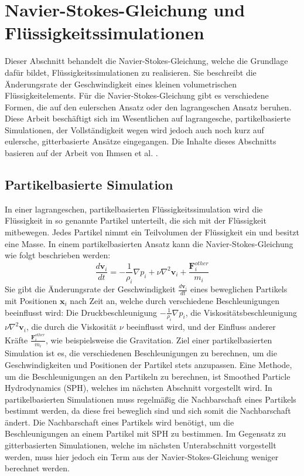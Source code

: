 \documentclass[11pt,
a4paper,
parskip=half, %
BCOR=10mm, %
english,
ngerman]{scrreprt}
\begin{document}
\section{Navier-Stokes-Gleichung und Flüssigkeitssimulationen}
Dieser Abschnitt behandelt die Navier-Stokes-Gleichung, welche die Grundlage dafür bildet, Flüssigkeitssimulationen zu realisieren.
Sie beschreibt die Änderungsrate der Geschwindigkeit eines kleinen volumetrischen Flüssigkeitelements.
Für die Navier-Stokes-Gleichung gibt es verschiedene Formen, die auf den eulerschen Ansatz oder den lagrangeschen Ansatz beruhen.
Diese Arbeit beschäftigt sich im Wesentlichen auf lagrangesche, partikelbasierte Simulationen,
der Vollständigkeit wegen wird jedoch auch noch kurz auf eulersche, gitterbasierte Ansätze eingegangen.
Die Inhalte dieses Abschnitts basieren auf der Arbeit von Ihmsen et al. \cite{ihmsen_sph_2014}.


\subsection{Partikelbasierte Simulation}
In einer lagrangeschen, partikelbasierten Flüssigkeitssimulation wird die Flüssigkeit in so genannte Partikel unterteilt,
die sich mit der Flüssigkeit mitbewegen. Jedes Partikel nimmt ein Teilvolumen der Flüssigkeit ein und besitzt eine Masse.
In einem partikelbasierten Ansatz kann die Navier-Stokes-Gleichung wie folgt beschrieben werden:
\begin{equation}
    \frac{d\textbf{v}_i}{dt} = -\frac{1}{\rho_i} \nabla p_i + \nu \nabla^2 \textbf{v}_i + \frac{\textbf{F}_i^{other}}{m_i}
\end{equation}
Sie gibt die Änderungsrate der Geschwindigkeit $\frac{d\textbf{v}_i}{dt}$ eines beweglichen Partikels mit Positionen $\textbf{x}_i$ nach Zeit an,
welche durch verschiedene Beschleunigungen beeinflusst wird:
Die Druckbeschleunigung $-\frac{1}{\rho_i} \nabla p_i$,
die Viskositätsbeschleunigung $\nu \nabla^2 \textbf{v}_i$, die durch die Viskosität $\nu$ beeinflusst wird,
und der Einfluss anderer Kräfte $\frac{\textbf{F}_i^{other}}{m_i}$,
wie beispielsweise die Gravitation.
Ziel einer partikelbasierten Simulation ist es, die verschiedenen Beschleunigungen zu berechnen,
um die Geschwindigkeiten und Positionen der Partikel stets anzupassen.
Eine Methode, um die Beschleunigungen an den Partikeln zu berechnen, ist Smoothed Particle Hydrodynamics (SPH),
welches im nächsten Abschnitt vorgestellt wird.
In partikelbasierten Simulationen muss regelmäßig die Nachbarschaft eines Partikels bestimmt werden,
da diese frei beweglich sind und sich somit die Nachbarschaft ändert.
Die Nachbarschaft eines Partikels wird benötigt, um die Beschleunigungen an einem Partikel mit SPH zu bestimmen.
Im Gegensatz zu gitterbasierten Simulationen, welche im nächsten Unterabschnitt vorgestellt werden,
muss hier jedoch ein Term aus der Navier-Stokes-Gleichung weniger berechnet werden.
\end{document}
